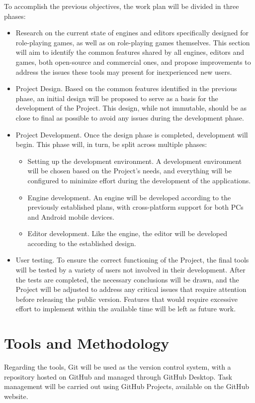 To accomplish the previous objectives, the work plan will be divided in three phases: 
\begin{itemize}
	\item Research on the current state of engines and editors specifically designed for role-playing games, as well as on role-playing games themselves. This section will aim to identify the common features shared by all engines, editors and games, both open-source and commercial ones, and propose improvements to address the issues these tools may present for inexperienced new users. 
	\item Project Design. Based on the common features identified in the previous phase, an initial design will be proposed to serve as a basis for the development of the Project. This design, while not immutable, should be as close to final as possible to avoid any issues during the development phase.
	\item Project Development. Once the design phase is completed, development will begin. This phase will, in turn, be split across multiple phases:
		\begin{itemize}
			\item Setting up the development environment. A development environment will be chosen based on the Project's needs, and everything will be configured to minimize effort during the development of the applications.
			\item Engine development. An engine will be developed according to the previously established plans, with cross-platform support for both PCs and Android mobile devices.
			\item Editor development. Like the engine, the editor will be developed according to the established design.
		\end{itemize}
	\item User testing. To ensure the correct functioning of the Project, the final tools will be tested by a variety of users not involved in their development. After the tests are completed, the necessary conclusions will be drawn, and the Project will be adjusted to address any critical issues that require attention before releasing the public version. Features that would require excessive effort to implement within the available time will be left as future work.
\end{itemize}


\section*{Tools and Methodology}
Regarding the tools, Git will be used as the version control system, with a repository hosted on GitHub and managed through GitHub Desktop. Task management will be carried out using GitHub Projects, available on the GitHub website.

